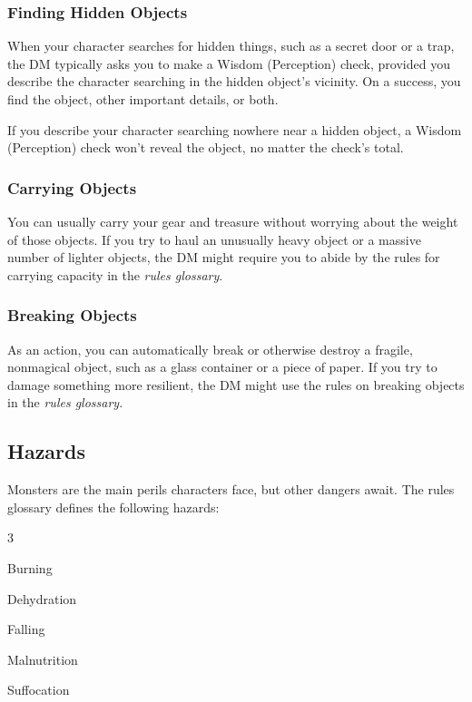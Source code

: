 \documentclass[10pt,a4paper,twoside,bg=print,twocolumn,openany,nodeprecatedcode]{dndbook}
\begin{document}
\subsubsection{Finding Hidden Objects}
When your character searches for hidden things, such as a secret door or a trap, the DM typically asks you to make a Wisdom (Perception) check, provided you describe the character searching in the hidden object's vicinity. On a success, you find the object, other important details, or both.

If you describe your character searching nowhere near a hidden object, a Wisdom (Perception) check won't reveal the object, no matter the check's total.

\subsubsection{Carrying Objects}
You can usually carry your gear and treasure without worrying about the weight of those objects. If you try to haul an unusually heavy object or a massive number of lighter objects, the DM might require you to abide by the rules for carrying capacity in the \textit{rules glossary}.

\subsubsection{Breaking Objects}
As an action, you can automatically break or otherwise destroy a fragile, nonmagical object, such as a glass container or a piece of paper. If you try to damage something more resilient, the DM might use the rules on breaking objects in the \textit{rules glossary}.

\subsection{Hazards}
Monsters are the main perils characters face, but other dangers await. The rules glossary defines the following hazards:


\begin{itemize}
\begin{multicols}{3}
\item Burning
\item Dehydration
\item Falling
\item Malnutrition
\item Suffocation
\end{multicols}

\end{itemize}
\end{document}
